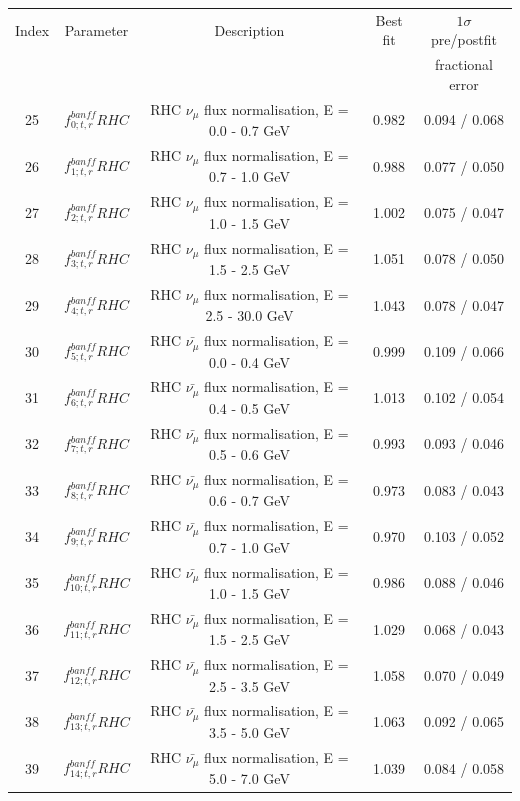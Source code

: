 \begin{tabular} { | c | c | c | c | c |  }
\hline 
Index & Parameter & Description & Best fit & $1\sigma$ pre/postfit\\ 
 & &  &  & fractional error\\
\hline 
25 & $f_{0; t, r}^{banff} RHC$ & RHC $\nu_\mu$ flux normalisation, E = 0.0 - 0.7 GeV & 0.982 & 0.094 / 0.068\\ 
26 & $f_{1; t, r}^{banff} RHC$ & RHC $\nu_\mu$ flux normalisation, E = 0.7 - 1.0 GeV & 0.988 & 0.077 / 0.050\\ 
27 & $f_{2; t, r}^{banff} RHC$ & RHC $\nu_\mu$ flux normalisation, E = 1.0 - 1.5 GeV & 1.002 & 0.075 / 0.047\\ 
28 & $f_{3; t, r}^{banff} RHC$ & RHC $\nu_\mu$ flux normalisation, E = 1.5 - 2.5 GeV & 1.051 & 0.078 / 0.050\\ 
29 & $f_{4; t, r}^{banff} RHC$ & RHC $\nu_\mu$ flux normalisation, E = 2.5 - 30.0 GeV & 1.043 & 0.078 / 0.047\\ 
30 & $f_{5; t, r}^{banff} RHC$ & RHC $\bar{\nu_\mu}$ flux normalisation, E = 0.0 - 0.4 GeV & 0.999 & 0.109 / 0.066\\ 
31 & $f_{6; t, r}^{banff} RHC$ & RHC $\bar{\nu_\mu}$ flux normalisation, E = 0.4 - 0.5 GeV & 1.013 & 0.102 / 0.054\\ 
32 & $f_{7; t, r}^{banff} RHC$ & RHC $\bar{\nu_\mu}$ flux normalisation, E = 0.5 - 0.6 GeV & 0.993 & 0.093 / 0.046\\ 
33 & $f_{8; t, r}^{banff} RHC$ & RHC $\bar{\nu_\mu}$ flux normalisation, E = 0.6 - 0.7 GeV & 0.973 & 0.083 / 0.043\\ 
34 & $f_{9; t, r}^{banff} RHC$ & RHC $\bar{\nu_\mu}$ flux normalisation, E = 0.7 - 1.0 GeV & 0.970 & 0.103 / 0.052\\ 
35 & $f_{10; t, r}^{banff} RHC$ & RHC $\bar{\nu_\mu}$ flux normalisation, E = 1.0 - 1.5 GeV & 0.986 & 0.088 / 0.046\\ 
36 & $f_{11; t, r}^{banff} RHC$ & RHC $\bar{\nu_\mu}$ flux normalisation, E = 1.5 - 2.5 GeV & 1.029 & 0.068 / 0.043\\ 
37 & $f_{12; t, r}^{banff} RHC$ & RHC $\bar{\nu_\mu}$ flux normalisation, E = 2.5 - 3.5 GeV & 1.058 & 0.070 / 0.049\\ 
38 & $f_{13; t, r}^{banff} RHC$ & RHC $\bar{\nu_\mu}$ flux normalisation, E = 3.5 - 5.0 GeV & 1.063 & 0.092 / 0.065\\ 
39 & $f_{14; t, r}^{banff} RHC$ & RHC $\bar{\nu_\mu}$ flux normalisation, E = 5.0 - 7.0 GeV & 1.039 & 0.084 / 0.058\\ 

\end{tabular}
